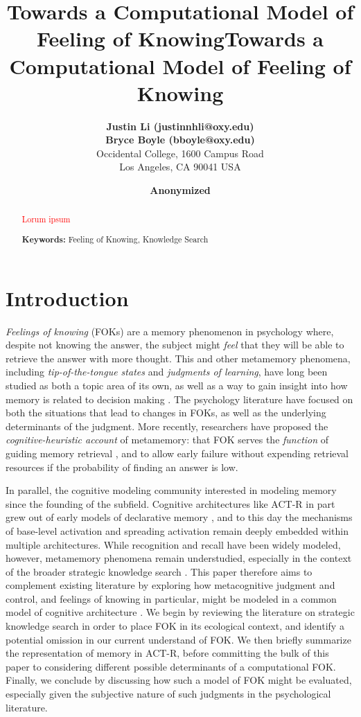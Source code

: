 \documentclass[10pt,letterpaper]{article}
\title{Towards a Computational Model of Feeling of Knowing}
\author{
        {\large \bf Justin Li (justinnhli@oxy.edu)} \\
        {\large \bf Bryce Boyle (bboyle@oxy.edu)} \\
        Occidental College, 1600 Campus Road \\
        Los Angeles, CA 90041 USA
    }
\title{Towards a Computational Model of Feeling of Knowing}
\author{
    {\large \bf Anonymized}
}
\newcommand{\fixme}[2][]{#2}
\renewcommand{\fixme}[2][]{\textcolor{red}{#2}}
\begin{document}
\maketitle

\begin{abstract}

    \fixme{Lorum ipsum}

    \textbf{Keywords:} Feeling of Knowing, Knowledge Search

\end{abstract}

\section{Introduction}

\emph{Feelings of knowing} (FOKs) are a memory phenomenon in psychology where, despite not knowing the answer, the subject might \emph{feel} that they will be able to retrieve the answer with more thought.
This and other metamemory phenomena, including \emph{tip-of-the-tongue states} and \emph{judgments of learning}, have long been studied as both a topic area of its own, as well as a way to gain insight into how memory is related to decision making \cite{Nelson1994WhyInvestigateMetacognition}.
The psychology literature have focused on both the situations that lead to changes in FOKs, as well as the underlying determinants of the judgment.
More recently, researchers have proposed the \emph{cognitive-heuristic account} of metamemory: that FOK serves the \emph{function} of guiding memory retrieval \cite{Schwartz2011TipOfThe}, and to allow early failure without expending retrieval resources if the probability of finding an answer is low.

In parallel, the cognitive modeling community interested in modeling memory since the founding of the subfield.
Cognitive architectures like ACT-R \cite{Anderson2007HowCanThe} in part grew out of early models of declarative memory \cite{Anderson1983ASpreadingActivation, Anderson1991ReflectionsOfThe}, and to this day the mechanisms of base-level activation and spreading activation remain deeply embedded within multiple architectures.
While recognition and recall have been widely modeled, however, metamemory phenomena remain understudied, especially in the context of the broader strategic knowledge search \cite{Newell1972HumanProblemSolving}.
This paper therefore aims to complement existing literature by exploring how metacognitive judgment and control, and feelings of knowing in particular, might be modeled in a common model of cognitive architecture \cite{Laird2017AStandardModel}.
We begin by reviewing the literature on strategic knowledge search in order to place FOK in its ecological context, and identify a potential omission in our current understand of FOK.
We then briefly summarize the representation of memory in ACT-R, before committing the bulk of this paper to considering different possible determinants of a computational FOK.
Finally, we conclude by discussing how such a model of FOK might be evaluated, especially given the subjective nature of such judgments in the psychological literature.
\end{document}
